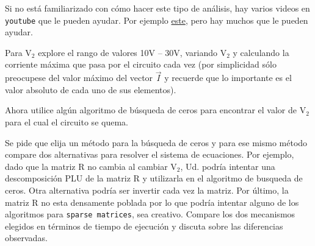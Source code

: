 \documentclass[letter, 11pt]{article}
\begin{document}
\begin{ayuda}
  \small
  Si no está familiarizado con cómo hacer este tipo de análisis, hay varios
  videos en \texttt{youtube} que le pueden ayudar. Por ejemplo
  \href{https://www.youtube.com/watch?v=DPNuiyi6XLQ&t=131s}{este}, pero hay
  muchos que le pueden ayudar.
\end{ayuda}


Para V$_2$ explore el rango de valores 10V -- 30V, variando V$_2$ y calculando
la corriente máxima que pasa por el circuito cada vez (por simplicidad sólo
preocupese del valor máximo del vector $\vec{I}$ y recuerde que lo importante
es el valor absoluto de cada uno de sus elementos).

Ahora utilice algún algoritmo de búsqueda de ceros para encontrar el valor de
V$_2$ para el cual el circuito se quema.

\vspace{0.5em}
Se pide que elija un método para la búsqueda de ceros y para ese mismo método
compare dos alternativas para resolver el sistema de ecuaciones. Por ejemplo,
dado que la matriz R no cambia al cambiar V$_2$, Ud. podría intentar una
descomposición PLU de la matriz R y utilizarla en el algoritmo de busqueda de
ceros. Otra alternativa podría ser invertir cada vez la matriz. Por último, la
matriz R no esta densamente poblada por lo que podría intentar alguno de los
algoritmos para \texttt{sparse matrices}, sea creativo. Compare los dos
mecanismos elegidos en términos de tiempo de ejecución y discuta sobre las
diferencias observadas.
\end{document}
